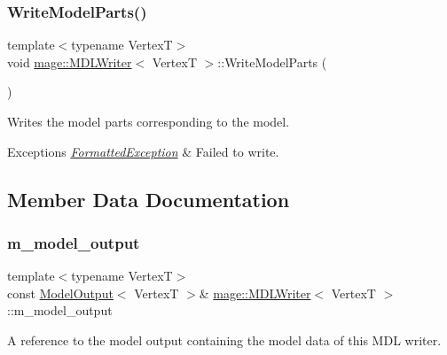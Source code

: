 \subsubsection{\texorpdfstring{Write\+Model\+Parts()}{WriteModelParts()}}
{\footnotesize\ttfamily template$<$typename VertexT$>$ \\
void \hyperlink{classmage_1_1_m_d_l_writer}{mage\+::\+M\+D\+L\+Writer}$<$ VertexT $>$\+::Write\+Model\+Parts (\begin{DoxyParamCaption}{ }\end{DoxyParamCaption})\hspace{0.3cm}{\ttfamily [private]}}

Writes the model parts corresponding to the model.


\begin{DoxyExceptions}{Exceptions}
{\em \hyperlink{structmage_1_1_formatted_exception}{Formatted\+Exception}} & Failed to write. \\
\hline
\end{DoxyExceptions}


\subsection{Member Data Documentation}
\hypertarget{classmage_1_1_m_d_l_writer_a607fc83a3dbab79f55c3eaca203c027b}{}\label{classmage_1_1_m_d_l_writer_a607fc83a3dbab79f55c3eaca203c027b} 
\subsubsection{\texorpdfstring{m\+\_\+model\+\_\+output}{m\_model\_output}}
{\footnotesize\ttfamily template$<$typename VertexT$>$ \\
const \hyperlink{structmage_1_1_model_output}{Model\+Output}$<$ VertexT $>$\& \hyperlink{classmage_1_1_m_d_l_writer}{mage\+::\+M\+D\+L\+Writer}$<$ VertexT $>$\+::m\+\_\+model\+\_\+output\hspace{0.3cm}{\ttfamily [private]}}

A reference to the model output containing the model data of this M\+DL writer. 